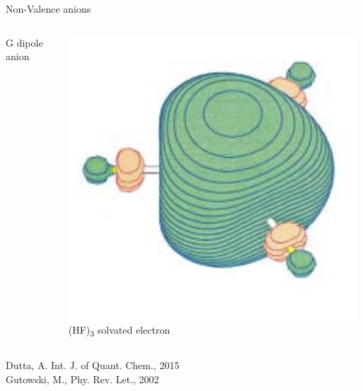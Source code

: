 \documentclass[9pt,t,xcolor=table]{beamer}
\begin{document}
\begin{frame}{\huge Non-Valence anions}
\begin{columns}
\begin{column}{0.3\textwidth}
			G dipole anion
		\end{column}
		\begin{column}{0.27\textwidth}
			\centering
			\includegraphics[width=\textwidth]{Figs/hf3.png}
			(HF)\textsubscript{3} solvated electron
		\end{column}	
	\end{columns}
	\vspace{5pt}
	\tiny Dutta, A. Int. J. of Quant. Chem., 2015\\
	Gutowski, M., Phy. Rev. Let., 2002
\end{frame}
\end{document}
